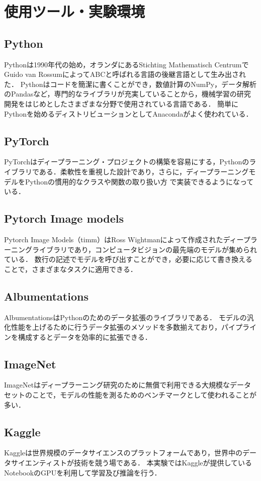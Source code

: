 \documentclass[a4paper, oneside, openany, dvipdfmx]{suribt}%
\begin{document}
\section{使用ツール・実験環境}
\subsection{Python}
Pythonは1990年代の始め，オランダにあるStichting Mathematisch CentrumでGuido van RossumによってABCと呼ばれる言語の後継言語として生み出された．
Pythonはコードを簡潔に書くことができ，数値計算のNumPy，データ解析のPandasなど，専門的なライブラリが充実していることから，機械学習の研究開発をはじめとしたさまざまな分野で使用されている言語である．
簡単にPythonを始めるディストリビューションとしてAnacondaがよく使われている．
\subsection{PyTorch}
PyTorchはディープラーニング・プロジェクトの構築を容易にする，Pythonのライブラリである．柔軟性を重視した設計であり，さらに，ディープラーニングモデルをPythonの慣用的なクラスや関数の取り扱い方
で実装できるようになっている．
\subsection{Pytorch Image models}
Pytorch Image Models（timm）はRoss Wightmanによって作成されたディープラーニングライブラリであり，コンピュータビジョンの最先端のモデルが集められている．
数行の記述でモデルを呼び出すことができ，必要に応じて書き換えることで，さまざまなタスクに適用できる．
\subsection{Albumentations}
AlbumentationsはPythonのためのデータ拡張のライブラリである．
モデルの汎化性能を上げるために行うデータ拡張のメソッドを多数揃えており，パイプラインを構成するとデータを効率的に拡張できる．
\subsection{ImageNet}
ImageNetはディープラーニング研究のために無償で利用できる大規模なデータセットのことで，モデルの性能を測るためのベンチマークとして使われることが多い．
\subsection{Kaggle}
Kaggleは世界規模のデータサイエンスのプラットフォームであり，世界中のデータサイエンティストが技術を競う場である．
本実験ではKaggleが提供しているNotebookのGPUを利用して学習及び推論を行う．
\end{document}
